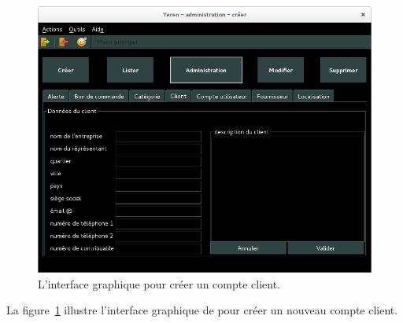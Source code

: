 
\newpage
{}\label{sec:administration-comptes-clients-lister}

\begin{figure}[!htpb]
	\centering
	\includegraphics[scale=0.45]{images/compte-client-creer.png}
	\caption{L'interface graphique pour cr\'eer un compte client.}
	\label{fig:admin-comptes-clients-creer}
\end{figure}

La figure~\ref{fig:admin-comptes-clients-creer} illustre
l'interface graphique de \yeren pour cr\'eer un nouveau
compte client.

